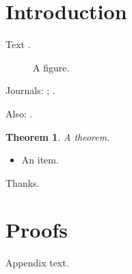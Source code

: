 \documentclass{aascopy}
\newtheorem{thm}{Theorem}[section]
\begin{document}
\begin{abstract}
An abstract.
\end{abstract}
\section{Introduction}
Text \aasextra.
\begin{figure}[h]
\caption{A figure.}
\end{figure}
\begin{table}[h]
\caption{A table.}
\end{table}
Journals: \apj; \ao.

Also: \aj.
\begin{thm}
A theorem.
\end{thm}
\begin{itemize}
\item An item.
\end{itemize}
\acknowledgments
Thanks.
\appendix
\section{Proofs}
Appendix text.
\end{document}
